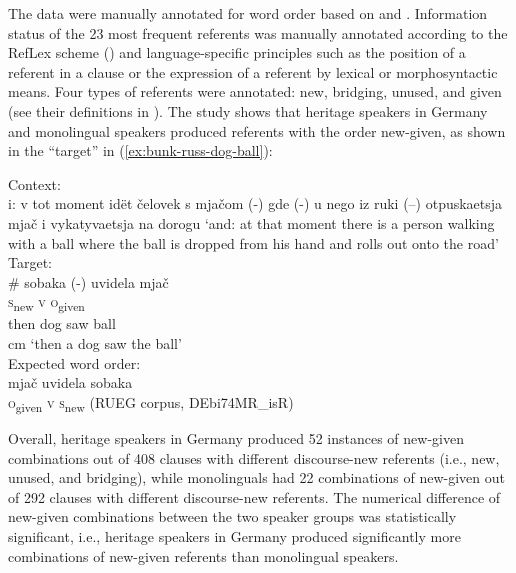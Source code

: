 \documentclass[output=paper,colorlinks,citecolor=brown]{langscibook}
\begin{document}
The data were manually annotated for word order based on \citet{bailyn_syntax_2012} and \citet{villavicencio_learning_2002}. Information status of the 23 most frequent referents was manually annotated according to the RefLex scheme (\cite{riester_reflex_2017}) and language-specific principles such as the position of a referent in a clause or the expression of a referent by lexical or morphosyntactic means. Four types of referents were annotated: new, bridging, unused, and given (see their definitions in \citealt[5]{riester_reflex_2017}). 
The study shows that heritage speakers in Germany and monolingual speakers produced referents with the order new-given, as shown in the “target” in (\ref{ex:bunk-russ-dog-ball}):\largerpage

\begin{exe} 
\ex \label{ex:bunk-russ-dog-ball}
 Context: \\
 {i: v tot moment idët čelovek s mjačom (-) gde (-) u nego iz ruki (--) otpuskaetsja mjač i vykatyvaetsja na dorogu} 
 \glt ‘and: at that moment there is a person walking with a ball where the ball is dropped from his hand and rolls out onto the road'\medskip\\
Target: \\
\#  {sobaka} {(-)} {uvidela} {mjač} \\
{} \textsc{s}\textsubscript{new} {} \textsc{v} \textsc{o}\textsubscript{given} \\
then dog {} saw ball\\
\glt {} cm ‘then a dog saw the ball’ \medskip\\
Expected word order: \\
 {mjač} {uvidela} {sobaka} {}\\
 {} \textsc{o}\textsubscript{given} \textsc{v} \textsc{s}\textsubscript{new} (RUEG corpus, DEbi74MR\_isR) \\
\end{exe}

Overall, heritage speakers in Germany produced 52 instances of new-given combinations out of 408 clauses with different discourse-new referents (i.e., new, unused, and bridging), while monolinguals had 22 combinations of new-given out of 292 clauses with different discourse-new referents. The numerical difference of new-given combinations between the two speaker groups was statistically significant, i.e., heritage speakers in Germany produced significantly more combinations of new-given referents than monolingual speakers.
\end{document}
